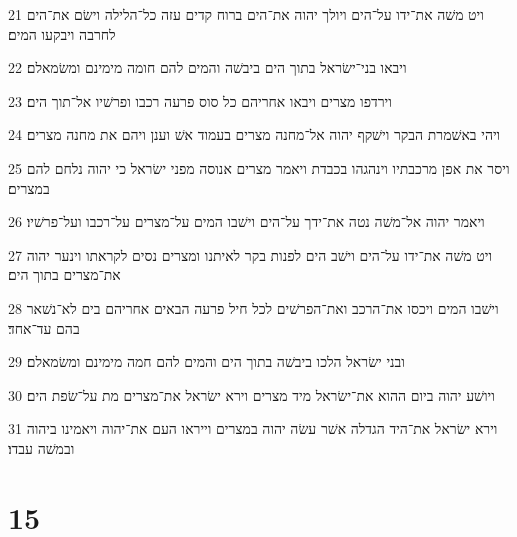 \par 21 ויט משׁה את־ידו על־הים ויולך יהוה את־הים ברוח קדים עזה כל־הלילה וישׂם את־הים לחרבה ויבקעו המים׃
\par 22 ויבאו בני־ישׂראל בתוך הים ביבשׁה והמים להם חומה מימינם ומשׂמאלם׃
\par 23 וירדפו מצרים ויבאו אחריהם כל סוס פרעה רכבו ופרשׁיו אל־תוך הים׃
\par 24 ויהי באשׁמרת הבקר וישׁקף יהוה אל־מחנה מצרים בעמוד אשׁ וענן ויהם את מחנה מצרים׃
\par 25 ויסר את אפן מרכבתיו וינהגהו בכבדת ויאמר מצרים אנוסה מפני ישׂראל כי יהוה נלחם להם במצרים׃
\par 26 ויאמר יהוה אל־משׁה נטה את־ידך על־הים וישׁבו המים על־מצרים על־רכבו ועל־פרשׁיו׃
\par 27 ויט משׁה את־ידו על־הים וישׁב הים לפנות בקר לאיתנו ומצרים נסים לקראתו וינער יהוה את־מצרים בתוך הים׃
\par 28 וישׁבו המים ויכסו את־הרכב ואת־הפרשׁים לכל חיל פרעה הבאים אחריהם בים לא־נשׁאר בהם עד־אחד׃
\par 29 ובני ישׂראל הלכו ביבשׁה בתוך הים והמים להם חמה מימינם ומשׂמאלם׃
\par 30 ויושׁע יהוה ביום ההוא את־ישׂראל מיד מצרים וירא ישׂראל את־מצרים מת על־שׂפת הים׃
\par 31 וירא ישׂראל את־היד הגדלה אשׁר עשׂה יהוה במצרים וייראו העם את־יהוה ויאמינו ביהוה ובמשׁה עבדו׃

\chapter{15}

